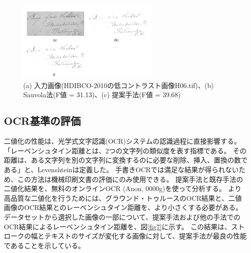 \documentclass[uplatex, twocolumn,10pt]{jsarticle}
\begin{document}
\begin{figure}[t]
    \begin{center}
        \includegraphics*[width=7cm]{image/master/Fig6.png}
        \caption{(a) 入力画像(HDIBCO-2010の低コントラスト画像H06.tif)、(b) Sauvola法(F値 = 31.13)、(c) 提案手法(F値 = 39.68)}
        \label{fig6}
    \end{center}
\end{figure}


\subsection{OCR基準の評価}

二値化の性能は、光学式文字認識(OCR)システムの認識過程に直接影響する。
「レーベンシュタイン距離とは、2つの文字列の類似度を表す指標である。
その距離は、ある文字列を別の文字列に変換するのに必要な削除、挿入、置換の数である」と、Levenshteinは定義した。
手書きOCRでは満足な結果が得られないため、この方法は機械印刷文書の評価にのみ使用できる。
提案手法と既存手法の二値化結果を、無料のオンラインOCR (Anon, 0000g)\cite{bib32}を使って分析する。
より高品質な二値化を行うためには、グラウンド・トゥルースのOCR結果と、二値画像のOCR結果とのレーベンシュタイン距離を、より小さくする必要がある。
データセットから選択した画像の一部について、提案手法および他の手法でのOCR結果によるレーベンシュタイン距離を、図\ref{fig7}に示す。
この結果は、ストロークの幅とテキストのサイズが変化する画像に対して、提案手法が最良の性能であることを示している。
\end{document}
